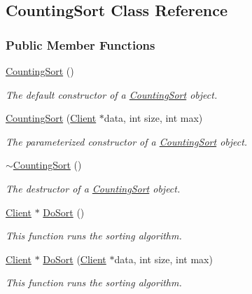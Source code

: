 \hypertarget{class_counting_sort}{}\subsection{Counting\+Sort Class Reference}
\label{class_counting_sort}
\subsubsection*{Public Member Functions}
\begin{DoxyCompactItemize}
\item 
\hyperlink{class_counting_sort_a535a1330331220653a34030805e67e30}{Counting\+Sort} ()
\begin{DoxyCompactList}\small\item\em The default constructor of a \hyperlink{class_counting_sort}{Counting\+Sort} object. \end{DoxyCompactList}\item 
\hyperlink{class_counting_sort_ac1b2582f9933bb7d65da365a3b5cf8bb}{Counting\+Sort} (\hyperlink{class_client}{Client} $\ast$data, int size, int max)
\begin{DoxyCompactList}\small\item\em The parameterized constructor of a \hyperlink{class_counting_sort}{Counting\+Sort} object. \end{DoxyCompactList}\item 
\hyperlink{class_counting_sort_a941a0d58043a739dda7d1c2959e6f954}{$\sim$\+Counting\+Sort} ()
\begin{DoxyCompactList}\small\item\em The destructor of a \hyperlink{class_counting_sort}{Counting\+Sort} object. \end{DoxyCompactList}\item 
\hyperlink{class_client}{Client} $\ast$ \hyperlink{class_counting_sort_a706f12e700460a5b88854a320906c529}{Do\+Sort} ()
\begin{DoxyCompactList}\small\item\em This function runs the sorting algorithm. \end{DoxyCompactList}\item 
\hyperlink{class_client}{Client} $\ast$ \hyperlink{class_counting_sort_a8153ecfe1f22fc62c2c63f9b41714a8a}{Do\+Sort} (\hyperlink{class_client}{Client} $\ast$data, int size, int max)
\begin{DoxyCompactList}\small\item\em This function runs the sorting algorithm. \end{DoxyCompactList}\end{DoxyCompactItemize}
